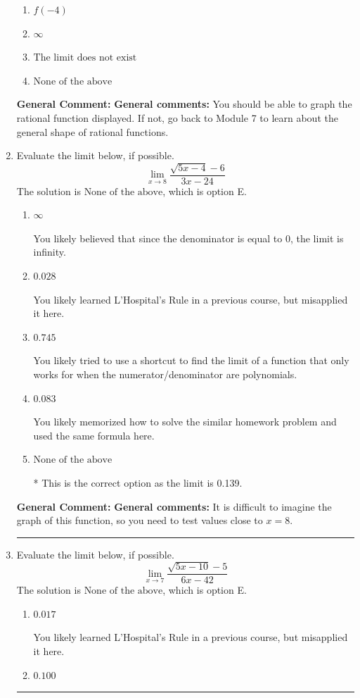 \documentclass{extbook}[14pt]
\newcommand{\litem}[1]{\item #1

\rule{\textwidth}{0.4pt}}
\begin{document}
\begin{enumerate}
{\begin{enumerate}[label=\Alph*.]
\item \( f(-4) \)


\item \( \infty \)


\item \( \text{The limit does not exist} \)


\item \( \text{None of the above} \)


\end{enumerate}

\textbf{General Comment:} \textbf{General comments:} You should be able to graph the rational function displayed. If not, go back to Module 7 to learn about the general shape of rational functions.
}
\litem{
Evaluate the limit below, if possible.
\[ \lim_{x \rightarrow 8} \frac{\sqrt{5x - 4} - 6}{3x - 24} \]The solution is \( \text{None of the above} \), which is option E.\begin{enumerate}[label=\Alph*.]
\item \( \infty \)

You likely believed that since the denominator is equal to 0, the limit is infinity.
\item \( 0.028 \)

You likely learned L'Hospital's Rule in a previous course, but misapplied it here.
\item \( 0.745 \)

You likely tried to use a shortcut to find the limit of a function that only works for when the numerator/denominator are polynomials.
\item \( 0.083 \)

You likely memorized how to solve the similar homework problem and used the same formula here.
\item \( \text{None of the above} \)

* This is the correct option as the limit is 0.139.
\end{enumerate}

\textbf{General Comment:} \textbf{General comments:} It is difficult to imagine the graph of this function, so you need to test values close to $x = 8$.
}
\litem{
Evaluate the limit below, if possible.
\[ \lim_{x \rightarrow 7} \frac{\sqrt{5x - 10} - 5}{6x - 42} \]The solution is \( \text{None of the above} \), which is option E.\begin{enumerate}[label=\Alph*.]
\item \( 0.017 \)

You likely learned L'Hospital's Rule in a previous course, but misapplied it here.
\item \( 0.100 \)


\end{enumerate}}
\end{enumerate}
\end{document}
